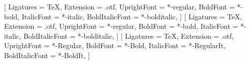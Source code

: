 %
%
\RequirePackage{fontspec}
\setmainfont{texgyrepagella}[%
  Ligatures = TeX,
  Extension = .otf,
  UprightFont = *-regular,
  BoldFont = *-bold,
  ItalicFont = *-italic,
  BoldItalicFont = *-bolditalic,
]
\setsansfont{texgyreheros}[%
  Ligatures = TeX,
  Extension = .otf,
  UprightFont = *-regular,
  BoldFont = *-bold,
  ItalicFont = *-italic,
  BoldItalicFont = *-bolditalic,
]
\setmonofont{SourceCodePro}[%
  Ligatures = TeX,
  Extension = .otf,
  UprightFont = *-Regular,
  BoldFont = *-Bold,
  ItalicFont = *-RegularIt,
  BoldItalicFont = *-BoldIt,
]
%
\RequirePackage{amsmath}
\RequirePackage{unicode-math}
